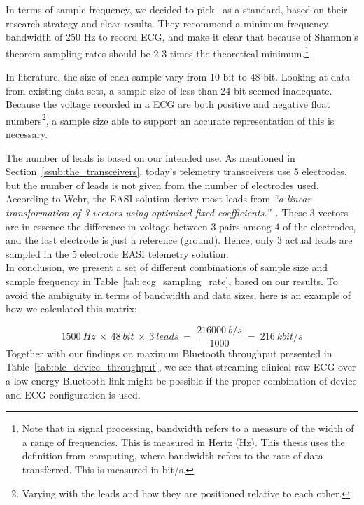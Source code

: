 \noindent
In terms of sample frequency, we decided to pick~\cite{Rijnbeek:2001vu} as a standard, based on their research strategy and clear results. They recommend a minimum frequency bandwidth of 250 Hz to record ECG, and make it clear that because of Shannon’s theorem sampling rates should be 2-3 times the theoretical minimum.\footnote{Note that in signal processing, bandwidth refers to a measure of the width of a range of frequencies. This is measured in Hertz (Hz). This thesis uses the definition from computing, where bandwidth refers to the rate of data transferred. This is measured in bit/s.}

In literature, the size of each sample vary from 10 bit to 48 bit. Looking at data from existing data sets, a sample size of less than 24 bit seemed inadequate. Because the voltage recorded in a ECG are both positive and negative float numbers\footnote{ Varying with the leads and how they are positioned relative to each other.}, a sample size able to support an accurate representation of this is necessary. 

The number of leads is based on our intended use. As mentioned in Section~\ref{ssub:the_transceivers}, today's telemetry transceivers use 5 electrodes, but the number of leads is not given from the number of electrodes used. According to Wehr, the EASI solution derive most leads from \textit{``a linear transformation of 3 vectors using optimized fixed coefficients.''}~\cite{Wehr:2006ht}. These 3 vectors are in essence the difference in voltage between 3 pairs among 4 of the electrodes, and the last electrode is just a reference (ground). Hence, only 3 actual leads are sampled in the 5 electrode EASI telemetry solution.
\\
\newline
\noindent
In conclusion, we present a set of different combinations of sample size and sample frequency in Table~\ref{tab:ecg_sampling_rate}, based on our results. To avoid the ambiguity in terms of bandwidth and data sizes, here is an example of how we calculated this matrix:

\[
  1500\:Hz\:\times\:48\:bit\:\times\:3\:leads\:=\:\frac{216000\:b/s}{1000}\:=\:216\:kbit/s
\]
\noindent
Together with our findings on maximum Bluetooth throughput presented in Table~\ref{tab:ble_device_throughput}, we see that streaming clinical raw ECG over a low energy Bluetooth link might be possible if the proper combination of device and ECG configuration is used.

